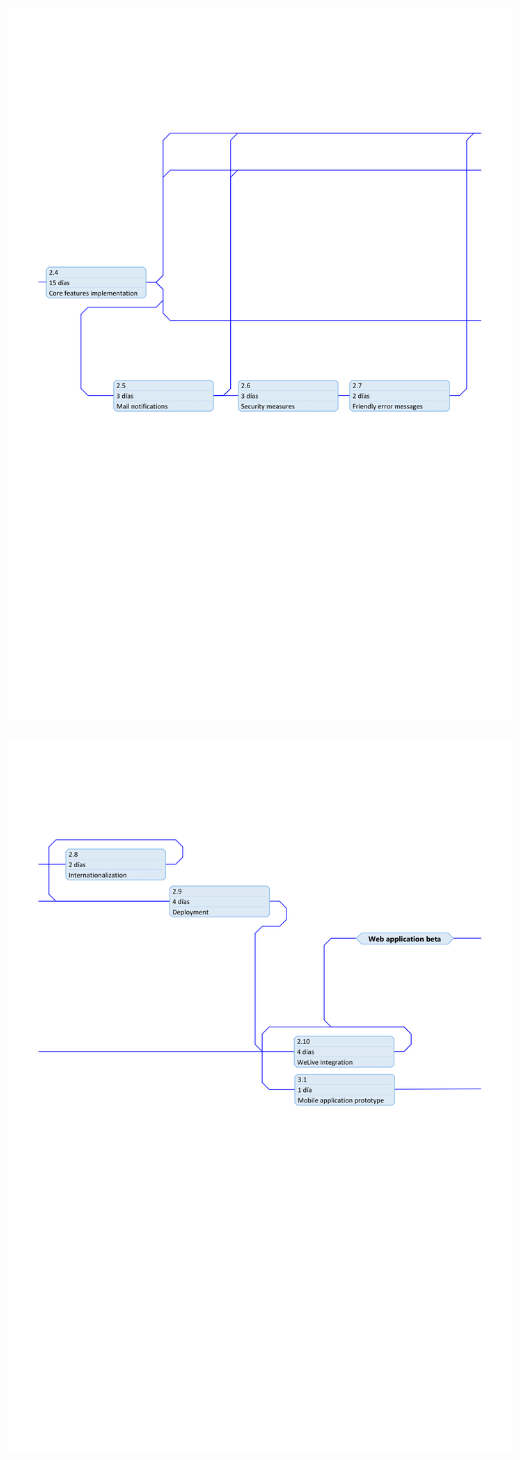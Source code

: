 \documentclass{DeustoFDP}
\begin{document}
\begin{center}
	\includegraphics[width=0.9\linewidth]{fig/precedence-2}
\end{center}
\begin{center}
	\includegraphics[width=0.9\linewidth]{fig/precedence-3}
\end{center}
\end{document}
